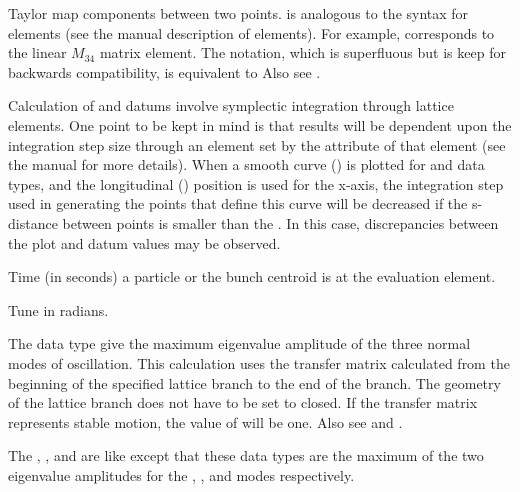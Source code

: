 \begin{description}
{{{{{{{{{  %
  \item[t.$ijklm\ldots$,  tt.$ijklm\ldots$ \hspace{0.2in} $1 \le i,j,k,\ldots \le 6$] \Newline {}
Taylor map components between two points.  is analogous to the  syntax for
 elements (see the \bmad manual description of  elements). For example,
 corresponds to the linear $M_{34}$ matrix element. The  notation,
which is superfluous but is keep for backwards compatibility, is equivalent to 
Also see .

Calculation of  and  datums involve symplectic integration
through lattice elements. One point to be kept in mind is that results will be dependent upon the
integration step size through an element set by the  attribute of that element (see the
\bmad manual for more details). When a smooth curve () is plotted for 
and  data types, and the longitudinal () position is used for the
x-axis, the integration step used in generating the points that define this curve will be decreased
if the s-distance between points is smaller than the .  In this case, discrepancies
between the plot and datum values may be observed.

  \item[time] \Newline {}
Time (in seconds) a particle or the bunch centroid is at the evaluation element.

  \item[tune.a, .b, .z] \Newline {}
Tune in radians.

  \item[unstable.eigen, unstable.eigen.a, .eigen.b, .eigen.c] \Newline {}
The  data type give the maximum eigenvalue amplitude of the three normal modes
of oscillation. This calculation uses the transfer matrix calculated from the beginning of the
specified lattice branch to the end of the branch. The geometry of the lattice branch does not have
to be set to closed. If the transfer matrix represents stable motion, the value of
 will be one. Also see  and .

The , , and  are like
 except that these data types are the maximum of the two eigenvalue amplitudes
for the , , and  modes respectively.

}}}}}}}}}
\end{description}
